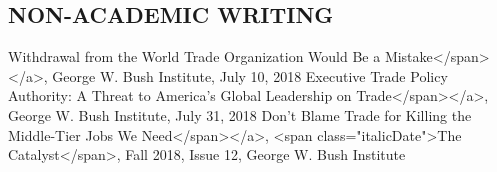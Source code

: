 \documentclass[11pt]{res}
\begin{document}
\begin{resume}
\section{NON-ACADEMIC WRITING}\vspace{1.5mm}
Withdrawal from the World Trade Organization Would Be a Mistake</span></a>, George W. Bush Institute, July 10, 2018
Executive Trade Policy Authority: A Threat to America’s Global Leadership on Trade</span></a>, George W. Bush Institute, July 31, 2018
Don't Blame Trade for Killing the Middle-Tier Jobs We Need</span></a>, <span class="italicDate">The Catalyst</span>, Fall 2018, Issue 12, George W. Bush Institute




\end{resume}
\end{document}
